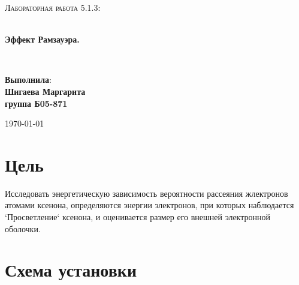 \documentclass[a4paper,14pt]{extarticle}
\begin{document}
\begin{titlepage}
\begin{center}


\textsc{\Large Лабораторная работа 5.1.3: \\ }

\HRule \\[0.4cm]
{ \LARGE \bfseries Эффект Рамзауэра. }

\HRule \\[1.5cm]

\noindent
\begin{minipage}{0.4\textwidth}
\begin{flushleft} \large
\end{flushleft}
\end{minipage}%
\begin{minipage}{0.4\textwidth}
\begin{flushright} \large
\end{flushright}
\end{minipage}

\large{\begin{flushright}
\vfill
\textbf{Выполнила}:\\
\textbf{Шигаева Маргарита\\}
\textbf{группа Б05-871}
\end{flushright}}

{\large \today}\\

\end{center}
\end{titlepage}




\section{Цель} %
\label{sec:цель}
Исследовать энергетическую зависимость вероятности рассеяния жлектронов атомами ксенона, определяются энергии электронов, при которых наблюдается `Просветление` ксенона, и оценивается размер его внешней электронной оболочки.

\section{Схема установки} %
\label{sec:схема_установки}
\end{document}
